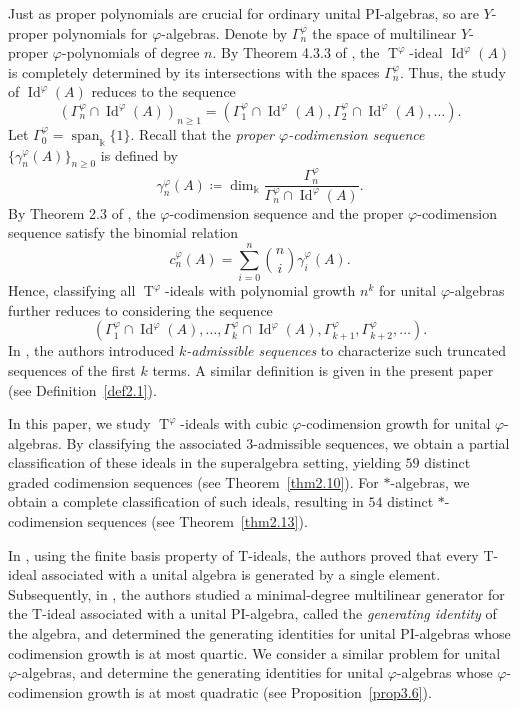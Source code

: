 \documentclass{amsart}
\theoremstyle{definition}
\theoremstyle{remark}
\numberwithin{equation}{section}
\def \Ga{\Gamma}
\def \ga{\gamma}
\def \vp{\varphi}
\def \k{\Bbbk}
\def \Id{\operatorname{Id}}
\def \sp{\operatorname{span}}
\def \T{\operatorname{T}}
\begin{document}
	Just as proper polynomials are crucial for ordinary unital PI-algebras, so are $Y$-proper polynomials for $\vp$-algebras. Denote by $\Ga_n^\vp$ the space of multilinear $Y$-proper $\vp$-polynomials of degree $n$. By Theorem 4.3.3 of \cite{Dr}, the $\T^\vp$-ideal $\Id^\vp(A)$ is completely determined by its intersections with the spaces $\Ga_n^\vp$. Thus, the study of $\Id^\vp(A)$ reduces to the sequence
	\[
	(\Ga_n^\vp \cap \Id^\vp(A))_{n \geq 1} = (\Ga_1^\vp \cap \Id^\vp(A), \Ga_2^\vp \cap \Id^\vp(A), \dots).
	\]
	Let $\Ga_0^\vp=\sp_\k\{1\}$. Recall that the \emph{proper $\vp$-codimension sequence} $\{\ga_n^\vp(A)\}_{n\geq 0}$ is defined by
	\[
	\ga_n^\vp(A) \coloneqq \dim_\k \frac{\Ga_n^\vp}{\Ga_n^\vp \cap \Id^\vp(A)}.
	\]
	By Theorem 2.3 of \cite{DG}, the $\vp$-codimension sequence and the proper $\vp$-codimension sequence satisfy the binomial relation
	\begin{equation} \label{0.0.1} \tag{E0.0.1}
		c_n^\vp (A) = \sum_{i=0}^{n} \binom{n}{i} \ga_i^\vp(A).
	\end{equation}
	Hence, classifying all $\T^\vp$-ideals with polynomial growth $n^k$ for unital $\vp$-algebras further reduces to considering the sequence 
	\[
	(\Ga_1^\vp \cap \Id^\vp(A), \dots, \Ga_k^\vp \cap \Id^\vp(A),\Ga_{k+1}^\vp, \Ga_{k+2}^\vp, \dots).
	\]
	In \cite{BFXYZZZ}, the authors introduced \emph{$k$-admissible sequences} to characterize such truncated sequences of the first $k$ terms. A similar definition is given in the present paper (see Definition~\ref{def2.1}).
	
	In this paper, we study $\T^\vp$-ideals with cubic $\vp$-codimension growth for unital $\vp$-algebras. By classifying the associated $3$-admissible sequences, we obtain a partial classification of these ideals in the superalgebra setting, yielding $59$ distinct graded codimension sequences (see Theorem~\ref{thm2.10}). For $*$-algebras, we obtain a complete classification of such ideals, resulting in $54$ distinct $*$-codimension sequences (see Theorem~\ref{thm2.13}).
	
	In \cite{BXYZZ}, using the finite basis property of T-ideals, the authors proved that every T-ideal associated with a unital algebra is generated by a single element. Subsequently, in \cite{BFXYZZZ}, the authors studied a minimal-degree multilinear generator for the T-ideal associated with a unital PI-algebra, called the \emph{generating identity} of the algebra, and determined the generating identities for unital PI-algebras whose codimension growth is at most quartic. We consider a similar problem for unital $\vp$-algebras, and determine the generating identities for unital $\vp$-algebras whose $\vp$-codimension growth is at most quadratic (see Proposition~\ref{prop3.6}).
	
\end{document}
